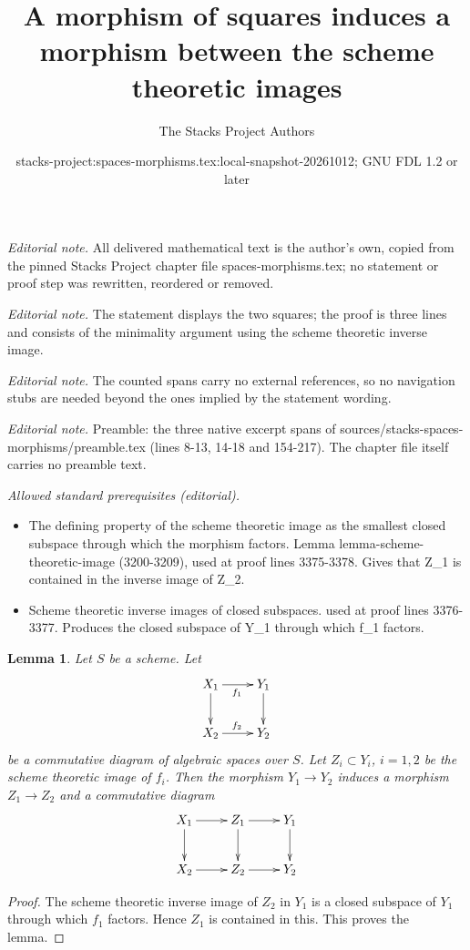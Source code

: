 \documentclass[10pt,a4paper]{amsart}
\title{A morphism of squares induces a morphism between the scheme theoretic images}
\author{The Stacks Project Authors}
\date{stacks-project:spaces-morphisms.tex:local-snapshot-20261012; GNU FDL 1.2 or later}
\theoremstyle{plain}
\newtheorem{lemma}[subsection]{Lemma}
\theoremstyle{definition}
\theoremstyle{remark}
\numberwithin{equation}{subsection}
\begin{document}
\maketitle
\setcounter{subsection}{1}
\noindent\textit{Editorial note.} All delivered mathematical text is the author's own, copied from the pinned Stacks Project chapter file spaces-morphisms.tex; no statement or proof step was rewritten, reordered or removed.\par\medskip
\noindent\textit{Editorial note.} The statement displays the two squares; the proof is three lines and consists of the minimality argument using the scheme theoretic inverse image.\par\medskip
\noindent\textit{Editorial note.} The counted spans carry no external references, so no navigation stubs are needed beyond the ones implied by the statement wording.\par\medskip
\noindent\textit{Editorial note.} Preamble: the three native excerpt spans of sources/stacks-spaces-morphisms/preamble.tex (lines 8-13, 14-18 and 154-217). The chapter file itself carries no preamble text.\par\medskip
\noindent\textit{Allowed standard prerequisites (editorial).}\begin{itemize}
\item The defining property of the scheme theoretic image as the smallest closed subspace through which the morphism factors. Lemma lemma-scheme-theoretic-image (3200-3209), used at proof lines 3375-3378. Gives that Z\_1 is contained in the inverse image of Z\_2.
\item Scheme theoretic inverse images of closed subspaces. used at proof lines 3376-3377. Produces the closed subspace of Y\_1 through which f\_1 factors.
\end{itemize}\medskip
\begin{lemma}
\label{lemma-factor-factor}
Let $S$ be a scheme. Let
$$
\xymatrix{
X_1 \ar[d] \ar[r]_{f_1} & Y_1 \ar[d] \\
X_2 \ar[r]^{f_2} & Y_2
}
$$
be a commutative diagram of algebraic spaces over $S$.
Let $Z_i \subset Y_i$, $i = 1, 2$ be
the scheme theoretic image of $f_i$. Then the morphism
$Y_1 \to Y_2$ induces a morphism $Z_1 \to Z_2$ and a
commutative diagram
$$
\xymatrix{
X_1 \ar[r] \ar[d] & Z_1 \ar[d] \ar[r] & Y_1 \ar[d] \\
X_2 \ar[r] & Z_2 \ar[r] & Y_2
}
$$
\end{lemma}

\begin{proof}
The scheme theoretic inverse image of $Z_2$ in $Y_1$
is a closed subspace of $Y_1$ through
which $f_1$ factors. Hence $Z_1$ is contained in this.
This proves the lemma.
\end{proof}
\end{document}
